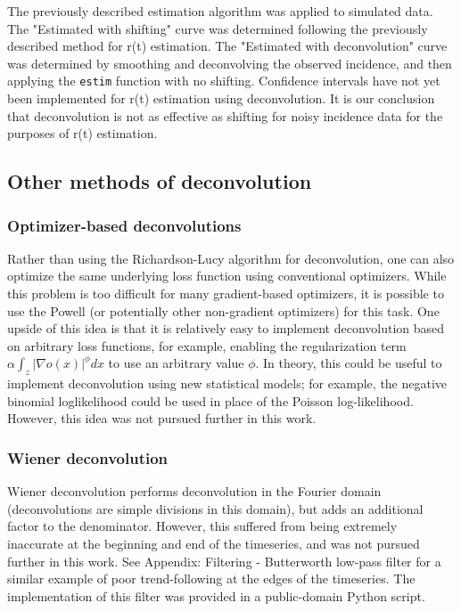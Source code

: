 \documentclass{article}
\newcommand{\code}[1]{\texttt{#1}}
\begin{document}
The previously described estimation algorithm was applied to simulated data. The "Estimated with shifting" curve was determined following the previously described method for r(t) estimation. The "Estimated with deconvolution" curve was determined by smoothing and deconvolving the observed incidence, and then applying the \code{estim} function with no shifting. Confidence intervals have not yet been implemented for r(t) estimation using deconvolution. 
It is our conclusion that deconvolution is not as effective as shifting for noisy incidence data for the purposes of r(t) estimation.

\subsection{Other methods of deconvolution}
\subsubsection{Optimizer-based deconvolutions}
Rather than using the Richardson-Lucy algorithm for deconvolution, one can also optimize the same underlying loss function using conventional optimizers. While this problem is too difficult for many gradient-based optimizers, it is possible to use the Powell (or potentially other non-gradient optimizers) for this task. One upside of this idea is that it is relatively easy to implement deconvolution based on arbitrary loss functions, for example, enabling the regularization term $\alpha \int_z |\nabla o(x)|^\phi dx$ to use an arbitrary value $\phi$. In theory, this could be useful to implement deconvolution using  new statistical models; for example, the negative binomial loglikelihood could be used in place of the Poisson log-likelihood. However, this idea was not pursued further in this work.

\subsubsection{Wiener deconvolution}
Wiener deconvolution performs deconvolution in the Fourier domain (deconvolutions are simple divisions in this domain), but adds an additional factor to the denominator. However, this suffered from being extremely inaccurate at the beginning and end of the timeseries, and was not pursued further in this work. See Appendix: Filtering - Butterworth low-pass filter for a similar example of poor trend-following at the edges of the timeseries. The implementation of this filter was provided in a public-domain Python script. \cite{wienerimplementation}
\end{document}
